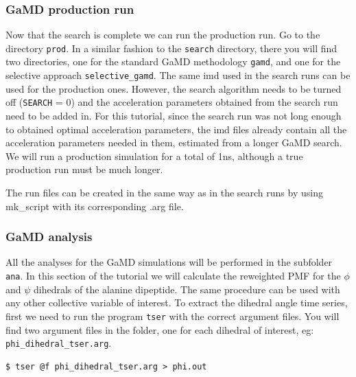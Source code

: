 \subsubsection{GaMD production run}
Now that the search is complete we can run the production run.
Go to the directory \texttt{prod}. In a similar fashion to the \texttt{search} directory, there you will find two directories, one for the standard GaMD methodology \texttt{gamd}, and one for the selective approach \texttt{selective\_gamd}. 
The same imd used in the search runs can be used for the production ones. However, the search algorithm needs to be turned off (\texttt{SEARCH} = 0) and the acceleration parameters obtained from the search run need to be added in. 
For this tutorial, since the search run was not long enough to obtained optimal acceleration parameters, the imd files already contain all the acceleration parameters needed in them, estimated from a longer GaMD search. We will run a production simulation for a total of 1ns, although a true production run must be much longer.

The run files can be created in the same way as in the search runs by using mk\_script with its corresponding .arg file.

\subsubsection{GaMD analysis}

All the analyses for the GaMD simulations will be performed in the subfolder \texttt{ana}. 
In this section of the tutorial we will calculate the reweighted PMF for the $\phi$ and $\psi$ dihedrals of the alanine dipeptide. The same procedure can be used with any other collective variable of interest.
To extract the dihedral angle time series, first we need to run the program \texttt{tser} with the correct argument files. You will find two argument files in the folder, one for each dihedral of interest, eg: \texttt{phi\_dihedral\_tser.arg}.
 \begin{lstlisting}
$ tser @f phi_dihedral_tser.arg > phi.out
\end{lstlisting}

